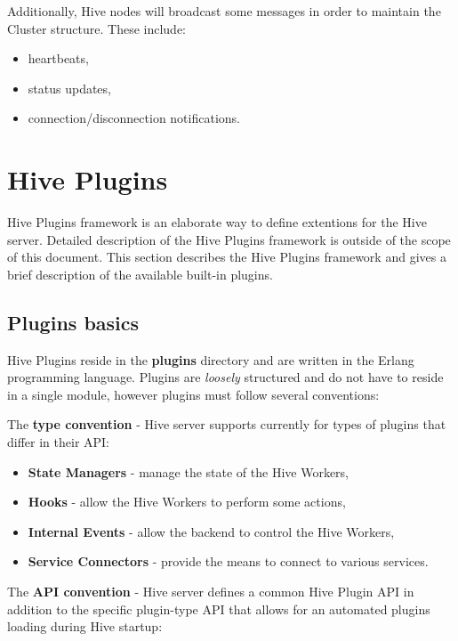 \documentclass[a4paper]{article}
\begin{document}
Additionally, Hive nodes will broadcast some messages in order to maintain the Cluster structure. These include:


\begin{itemize}
\item heartbeats,
\item status updates,
\item connection/disconnection notifications.
\end{itemize}

\pagebreak
\section{Hive Plugins}
\label{sec-9}
\label{ref-plugins}

Hive Plugins framework is an elaborate way to define extentions for the Hive server. Detailed description of the Hive Plugins framework is outside of the scope of this document. This section describes the Hive Plugins framework and gives a brief description of the available built-in plugins.
\subsection{Plugins basics}
\label{sec-9-1}

Hive Plugins reside in the \textbf{plugins} directory and are written in the Erlang programming language. Plugins are \emph{loosely} structured and do not have to reside in a single module, however plugins must follow several conventions:

\noindent
The \textbf{type convention} - Hive server supports currently for types of plugins that differ in their API:


\begin{itemize}
\item \textbf{State Managers} - manage the state of the Hive Workers,
\item \textbf{Hooks} - allow the Hive Workers to perform some actions,
\item \textbf{Internal Events} - allow the backend to control the Hive Workers,
\item \textbf{Service Connectors} - provide the means to connect to various services.
\end{itemize}

\noindent
The \textbf{API convention} - Hive server defines a common Hive Plugin API in addition to the specific plugin-type API that allows for an automated plugins loading during Hive startup:
\end{document}
